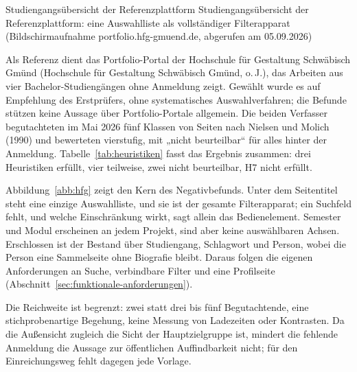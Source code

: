%
{Studiengangsübersicht der Referenzplattform}%
{Studiengangsübersicht der Referenzplattform: eine Auswahlliste als vollständiger Filterapparat (Bildschirmaufnahme portfolio.hfg-gmuend.de, abgerufen am 05.09.2026)}

Als Referenz dient das Portfolio-Portal der Hochschule für Gestaltung Schwäbisch Gmünd (Hochschule für Gestaltung Schwäbisch Gmünd, o.\,J.), das Arbeiten aus vier Bachelor-Studiengängen ohne Anmeldung zeigt. Gewählt wurde es auf Empfehlung des Erstprüfers, ohne systematisches Auswahlverfahren; die Befunde stützen keine Aussage über Portfolio-Portale allgemein. Die beiden Verfasser begutachteten im Mai 2026 fünf Klassen von Seiten nach Nielsen und Molich (1990) und bewerteten vierstufig, mit „nicht beurteilbar“ für alles hinter der Anmeldung. Tabelle~\ref{tab:heuristiken} fasst das Ergebnis zusammen: drei Heuristiken erfüllt, vier teilweise, zwei nicht beurteilbar, H7 nicht erfüllt.

Abbildung~\ref{abb:hfg} zeigt den Kern des Negativbefunds. Unter dem Seitentitel steht eine einzige Auswahlliste, und sie ist der gesamte Filterapparat; ein Suchfeld fehlt, und welche Einschränkung wirkt, sagt allein das Bedienelement. Semester und Modul erscheinen an jedem Projekt, sind aber keine auswählbaren Achsen. Erschlossen ist der Bestand über Studiengang, Schlagwort und Person, wobei die Person eine Sammelseite ohne Biografie bleibt. Daraus folgen die eigenen Anforderungen an Suche, verbindbare Filter und eine Profilseite (Abschnitt~\ref{sec:funktionale-anforderungen}).

Die Reichweite ist begrenzt: zwei statt drei bis fünf Begutachtende, eine stichprobenartige Begehung, keine Messung von Ladezeiten oder Kontrasten. Da die Außensicht zugleich die Sicht der Hauptzielgruppe ist, mindert die fehlende Anmeldung die Aussage zur öffentlichen Auffindbarkeit nicht; für den Einreichungsweg fehlt dagegen jede Vorlage.
